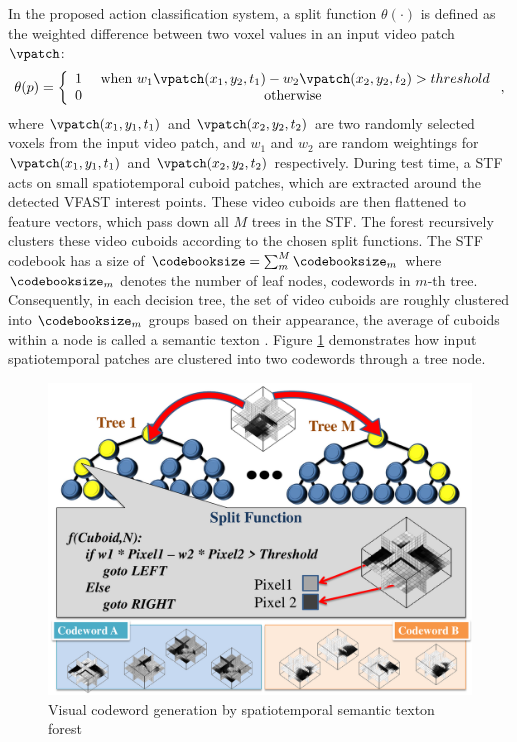 In the proposed action classification system, a split function $\theta(\cdot)$ is defined as the weighted difference between two voxel values in an input video patch $\vpatch$:
\begin{equation}
	\theta(p) = 
	\left\{
		\begin{array}{lc}
			1 & \mbox{ when } w_1 \vpatch(x_1,y_2,t_1) - w_2 \vpatch(x_2,y_2,t_2) > threshold \\  
			0 & \mbox{ otherwise } 
		\end{array}
	\right.,
	\label{eqn/act/stftest}
\end{equation}
where $\vpatch(x_1, y_1, t_1)$ and $\vpatch(x_2, y_2, t_2)$ are two randomly selected voxels from the input video patch, and $w_1$ and $w_2$ are random weightings for $\vpatch(x_1,y_1,t_1)$ and $\vpatch(x_2,y_2,t_2)$ respectively. 
During test time, a STF acts on small spatiotemporal cuboid patches, which are extracted around the detected VFAST interest points. These video cuboids are then flattened to feature vectors, which pass down all $M$ trees in the STF. 
The forest recursively clusters these video cuboids according to the chosen split functions.  
The STF codebook has a size of $\codebooksize=\sum_m^M \codebooksize_m$ where $\codebooksize_m$ denotes the number of leaf nodes, \ie codewords in $m$-th tree. 
Consequently, in each decision tree, the set of video cuboids are roughly clustered into $\codebooksize_m$ groups based on their appearance, the average of cuboids within a node is called a semantic texton \cite{Shotton2008}. 
Figure \ref{fig/act/stf} demonstrates how input spatiotemporal patches are clustered into two codewords through a tree node. 

\begin{figure}[ht]
	\centering 
	\includegraphics[width=0.8\linewidth]{fig/act/stf_new.pdf} 
	\caption{Visual codeword generation by spatiotemporal semantic texton forest}
	\label{fig/act/stf}
\end{figure}

